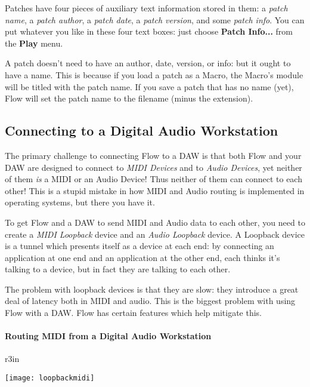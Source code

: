 \documentclass{article}
\newcommand\name{Flow}
\begin{document}
Patches have four pieces of auxiliary text information stored in them: a {\it patch name}, a {\it patch author}, a {\it patch date}, a {\it patch version}, and some {\it patch info}.  You can put whatever you like in these four text boxes: just choose {\bf Patch Info...} from the {\bf Play} menu.

A patch doesn't need to have an author, date, version, or info: but it ought to have a name.  This is because if you load a patch as a Macro, the Macro's module will be titled with the patch name.  If you save a patch that has no name (yet), {\name} will set the patch name to the filename (minus the extension).

\subsection{Connecting to a Digital Audio Workstation}
\label{connecting}

The primary challenge to connecting Flow to a DAW is that both Flow and your DAW are designed to connect to {\it MIDI Devices} and to {\it Audio Devices}, yet neither of them {\it is} a MIDI or an Audio Device!  Thus neither of them can connect to each other!  This is a stupid mistake in how MIDI and Audio routing is implemented in operating systems, but there you have it.

To get Flow and a DAW to send MIDI and Audio data to each other, you need to create a {\it MIDI Loopback} device and an {\it Audio Loopback} device.  A Loopback device is a tunnel which presents itself as a device at each end: by connecting an application at one end and an application at the other end, each thinks it's talking to a device, but in fact they are talking to each other.

The problem with loopback devices is that they are slow: they introduce a great deal of latency both in MIDI and audio.  This is the biggest problem with using Flow with a DAW.  Flow has certain features which help mitigate this.  

\paragraph{Routing MIDI from a Digital Audio Workstation}

\begin{wrapfigure}{r}{3in}
\vspace{-1em}
\begin{center}\texttt{[image: loopbackmidi]}\end{center}
\vspace{-1em}
\caption{A MIDI loopback connecting a Digital Audio Workstation to {\name}.  Compare to Figure~\ref{loopbackaudio}.}\label{loopbackmidi}
\end{wrapfigure}
\end{document}
